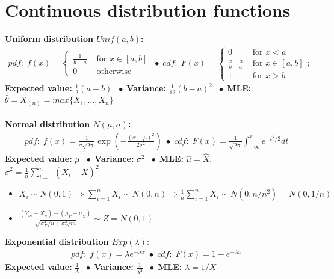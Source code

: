\documentclass{article}
\newcommand{\bspace}{$\;\bullet\;$}
\begin{document}
\section{Continuous distribution functions}
\textbf{Uniform distribution $Unif(a, b)$:}
\begin{align*}
    pdf: \; f(x) = \begin{cases}
        \frac{1}{b-a} & \textrm{ for } x \in [a,b]\\
        0 & \textrm{ otherwise}
    \end{cases} \;\bullet\;
    cdf: \; F(x) = \begin{cases}
        0 & \textrm{ for } x < a\\
        \frac{x-a}{b-a} & \textrm{ for } x \in [a,b]\\
        1 & \textrm{ for } x > b
    \end{cases}; 
\end{align*}
\textbf{Expected value:} $\frac{1}{2}(a + b)$ \bspace \textbf{Variance:} $\frac{1}{12}(b - a)^2$ \bspace \textbf{MLE:} $\hat{\theta} = X_{(n)} = max\{X_1, \dots, X_n\}$\\\\
\textbf{Normal distribution $N(\mu, \sigma)$:}
\begin{align*}
    pdf: \; f(x) = \frac{1}{\sigma \sqrt{2 \pi}} \exp \left (-\frac{(x - \mu)^2}{2 \sigma ^ 2}\right ) \;\bullet\;
    cdf: \; F(x) = \frac{1}{\sqrt{2 \pi}} \int_{- \infty}^x e^{-t^2 / 2} dt
\end{align*}
\textbf{Expected value:} $\mu$ \bspace \textbf{Variance:} $\sigma^2$ \bspace \textbf{MLE:} $\hat{\mu} = \hat{X}$,  $\hat{\sigma}^2 = \frac{1}{n}\sum_{i=1}^n(X_i - \bar{X})^2$
\begin{itemize}
    \item $X_i \sim N(0,1) \Longrightarrow \sum_{i=1}^nX_i \sim N(0,n) \Longrightarrow \frac{1}{n}\sum_{i=1}^nX_i \sim N(0,n/n^2) = N(0, 1/n)$
    \item $\frac{(\bar{Y}_m - \bar{X}_n) - (\mu_Y - \mu_X)}{\sqrt{\sigma_X^2/n + \sigma_Y^2/m}} \sim Z = N(0,1)$
\end{itemize}
\textbf{Exponential distribution $Exp(\lambda):$}
\begin{align*}
    pdf: \; f(x) = \lambda e^{-\lambda x} \;\bullet\; cdf: \; F(x) = 1 - e^{-\lambda x}
\end{align*}
\textbf{Expected value:} $\frac{1}{\lambda}$ \bspace \textbf{Variance:} $\frac{1}{\lambda^2}$ \bspace \textbf{MLE:} $\hat{\lambda} = 1 / \bar{X}$\\\\
\end{document}
